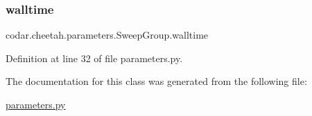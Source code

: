 \subsubsection{\texorpdfstring{walltime}{walltime}}
{\footnotesize\ttfamily codar.\+cheetah.\+parameters.\+Sweep\+Group.\+walltime}



Definition at line 32 of file parameters.\+py.



The documentation for this class was generated from the following file\+:\begin{DoxyCompactItemize}
\item 
\hyperlink{parameters_8py}{parameters.\+py}\end{DoxyCompactItemize}
